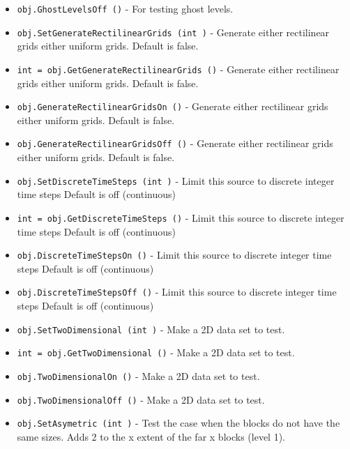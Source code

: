\begin{itemize}
\item  \verb|obj.GhostLevelsOff ()| -  For testing ghost levels.

\item  \verb|obj.SetGenerateRectilinearGrids (int )| -  Generate either rectilinear grids either uniform grids.
 Default is false.

\item  \verb|int = obj.GetGenerateRectilinearGrids ()| -  Generate either rectilinear grids either uniform grids.
 Default is false.

\item  \verb|obj.GenerateRectilinearGridsOn ()| -  Generate either rectilinear grids either uniform grids.
 Default is false.

\item  \verb|obj.GenerateRectilinearGridsOff ()| -  Generate either rectilinear grids either uniform grids.
 Default is false.

\item  \verb|obj.SetDiscreteTimeSteps (int )| -  Limit this source to discrete integer time steps
 Default is off (continuous)

\item  \verb|int = obj.GetDiscreteTimeSteps ()| -  Limit this source to discrete integer time steps
 Default is off (continuous)

\item  \verb|obj.DiscreteTimeStepsOn ()| -  Limit this source to discrete integer time steps
 Default is off (continuous)

\item  \verb|obj.DiscreteTimeStepsOff ()| -  Limit this source to discrete integer time steps
 Default is off (continuous)

\item  \verb|obj.SetTwoDimensional (int )| -  Make a 2D data set to test.

\item  \verb|int = obj.GetTwoDimensional ()| -  Make a 2D data set to test.

\item  \verb|obj.TwoDimensionalOn ()| -  Make a 2D data set to test.

\item  \verb|obj.TwoDimensionalOff ()| -  Make a 2D data set to test.

\item  \verb|obj.SetAsymetric (int )| -  Test the case when the blocks do not have the same sizes.
 Adds 2 to the x extent of the far x blocks (level 1).


\end{itemize}
